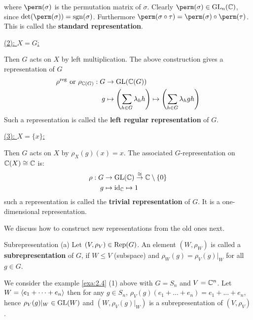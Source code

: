 \documentclass[twoside = false,	%
		headsepline,		%
		parskip = true,
		]{scrbook}						%
\begin{document}
            where $\perm(\sigma)$ is the permutation matrix of $\sigma$. Clearly $\perm(\sigma) \in \GL_n(\C)$, since $\det(\perm(\sigma)) = \sgn(\sigma)$. Furthermore $\perm(\sigma \circ \tau) = \perm(\sigma) \circ \perm(\tau)$.
            This is called the \textbf{standard representation}.
            
        \underline{(2): $X=G$:}
        
            Then $G$ acts on $X$ by left multiplication. The above construction gives a representation of $G$
            \begin{equation*}
            \begin{split}
                \rho^{\text{reg}} \text{ or } \rho_{\mathbb C(G)}: G &\to \mathrm{GL}(\mathbb C(G)) \\
                g &\mapsto \left( \sum_{h \in G} \lambda_h h \right) \mapsto \left( \sum_{h \in G} \lambda_h gh \right)
            \end{split}
            \end{equation*}
            Such a representation is called the \textbf{left regular representation} of $G$.
            
        \underline{(3): $X = \{x\}$:}
        
        Then $G$ acts on $X$ by $\rho_X(g)(x) = x$. The associated $G$-representation on $\mathbb C(X) \cong \mathbb C$ is:
        \begin{equation*}
        \begin{split}
            \rho: G &\to \mathrm{GL}(\mathbb C) \overset{\cong}{\to} \mathbb C\setminus\{0\} \\
            g &\mapsto \mathrm{id}_\mathbb C \mapsto 1
        \end{split}
        \end{equation*}
        such a representation is called the \textbf{trivial representation} of $G$. It is a one-dimensional representation.
        

        We discuss how to construct new representations from the old ones next.
        
        \begin{definition*}{Subrepresentation (a)}
            Let $(V,\rho_V) \in \mathrm{Rep}(G)$. An element $(W,\rho_W)$ is called a \textbf{subrepresentation} of $G$, if $W \leq V$ (subspace) and $\rho_W(g) = \rho_V(g)|_W$ for all $g \in G$.
        \end{definition*}
        
        We consider the example \ref{exa:2.4} (1) above with $G=S_n$ and $V=\mathbb C^n$. Let $W = \left\langle e_1 + \dots + e_n\right\rangle$ then for any $g \in S_n$, $\rho_V(g)(e_1 + \dots + e_n) = e_1 + \dots + e_n$, hence $\rho_V(g)|_W \in \mathrm{GL}(W)$ and $(W,\rho_V(g)|_W)$ is a subrepresentation of $(V,\rho_V)$.
        
\end{document}
